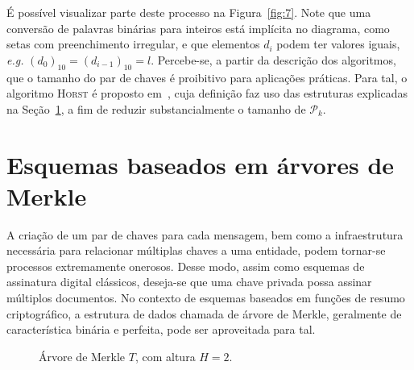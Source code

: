 \documentclass[12pt,notitlepage]{report}
\newcommand{\pk}{\mathcal{P}_k}
\newcommand{\hash}[2][]{\mathcal{H}^{#1}(#2)}
\newcommand{\concat}{\, \vert \vert \,}
\newcommand{\horst}{\textsc{Horst}}
\begin{document}
É possível visualizar parte deste processo na Figura~\ref{fig:7}. Note que uma conversão de palavras binárias para inteiros está implícita no diagrama, como setas com preenchimento irregular, e que elementos $d_i$ podem ter valores iguais, \emph{e.g.} $(d_{0})_{10} = (d_{i-1})_{10} = l$. Percebe-se, a partir da descrição dos algoritmos, que o tamanho do par de chaves é proibitivo para aplicações práticas. Para tal, o algoritmo \horst{} é proposto em~\cite{Bernstein2015}, cuja definição faz uso das estruturas explicadas na Seção~\ref{section:merkle}, a fim de reduzir substancialmente o tamanho de $\pk{}$.

\section{Esquemas baseados em árvores de Merkle}
\label{section:merkle}

A criação de um par de chaves para cada mensagem, bem como a infraestrutura
necessária para relacionar múltiplas chaves a uma entidade, podem tornar-se
processos extremamente onerosos. Desse modo, assim como esquemas de assinatura
digital clássicos, deseja-se que uma chave privada possa assinar múltiplos
documentos. No contexto de esquemas baseados em funções de resumo
criptográfico, a estrutura de dados chamada de árvore de Merkle, geralmente de
característica binária e perfeita, pode ser aproveitada para tal.

\begin{figure}[ht]
  \centering
  \caption{Árvore de Merkle $T$, com altura $H = 2$.}
  \label{fig:4}
\end{figure}
\end{document}
